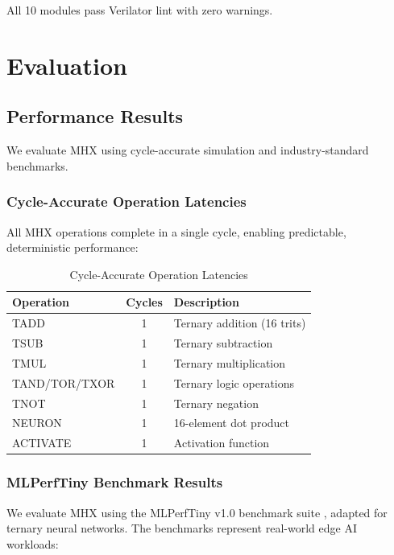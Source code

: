 \documentclass[conference,10pt]{IEEEtran}
\newcommand{\mhx}{\textsc{MHX\texttrademark}}
\begin{document}
All 10 modules pass Verilator lint with zero warnings.

\section{Evaluation}
\label{sec:evaluation}

\subsection{Performance Results}

We evaluate \mhx{} using cycle-accurate simulation and industry-standard benchmarks.

\subsubsection{Cycle-Accurate Operation Latencies}

All \mhx{} operations complete in a single cycle, enabling predictable, deterministic performance:

\begin{table}[h]
\centering
\caption{Cycle-Accurate Operation Latencies}
\label{tab:cycle_latencies}
\begin{tabular}{|l|c|l|}
\hline
\textbf{Operation} & \textbf{Cycles} & \textbf{Description} \\
\hline
TADD & 1 & Ternary addition (16 trits) \\
TSUB & 1 & Ternary subtraction \\
TMUL & 1 & Ternary multiplication \\
TAND/TOR/TXOR & 1 & Ternary logic operations \\
TNOT & 1 & Ternary negation \\
NEURON & 1 & 16-element dot product \\
ACTIVATE & 1 & Activation function \\
\hline
\end{tabular}
\end{table}

\subsubsection{MLPerfTiny Benchmark Results}

We evaluate \mhx{} using the MLPerfTiny v1.0 benchmark suite \cite{banbury2021mlperf}, adapted for ternary neural networks. The benchmarks represent real-world edge AI workloads:
\end{document}
